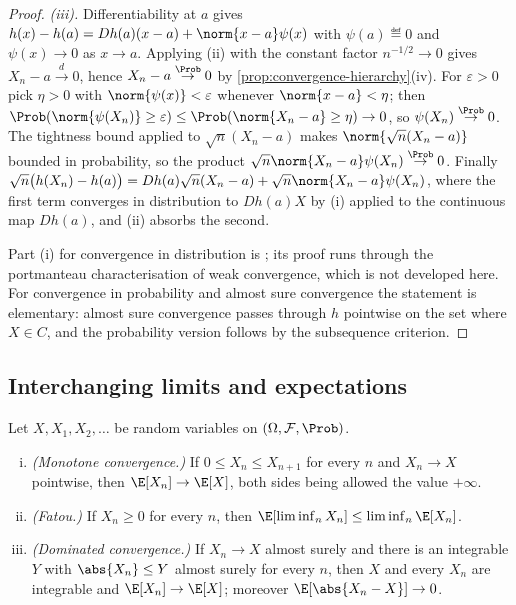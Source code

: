 \begin{proof}
	\emph{(iii).} Differentiability at $a$ gives
	$h(x)-h(a)=Dh(a)(x-a)+\norm{x-a}\psi(x)$ with $\psi(a)\eqdef0$ and
	$\psi(x)\to0$ as $x\to a$. Applying (ii) with the constant factor
	$n^{-1/2}\to0$ gives $X_n-a\overset{d}{\to}0$, hence
	$X_n-a\overset{\Prob}{\to}0$ by
	\autoref{prop:convergence-hierarchy}(iv). For $\varepsilon>0$ pick $\eta>0$
	with $\norm{\psi(x)}<\varepsilon$ whenever $\norm{x-a}<\eta$; then
	$\Prob(\norm{\psi(X_n)}\geq\varepsilon)\leq\Prob(\norm{X_n-a}\geq\eta)\to0$,
	so $\psi(X_n)\overset{\Prob}{\to}0$. The tightness bound applied to
	$\sqrt n(X_n-a)$ makes $\norm{\sqrt n(X_n-a)}$ bounded in probability, so
	the product $\sqrt n\norm{X_n-a}\psi(X_n)\overset{\Prob}{\to}0$. Finally
	$\sqrt n\bigl(h(X_n)-h(a)\bigr)
		=Dh(a)\sqrt n(X_n-a)+\sqrt n\norm{X_n-a}\psi(X_n)$, where the first term
	converges in distribution to $Dh(a)X$ by (i) applied to the continuous map
	$Dh(a)$, and (ii) absorbs the second.

	Part (i) for convergence in distribution is
	\textcite[Thm.~9.4.3, p.~562]{corbae2009introduction}; its proof runs
	through the portmanteau characterisation of weak convergence, which is not
	developed here. For convergence in probability and almost sure convergence
	the statement is elementary: almost sure convergence passes through $h$
	pointwise on the set where $X\in C$, and the probability version follows by
	the subsequence criterion.
\end{proof}

\subsection{Interchanging limits and expectations}\label{subsec:prob-convergence-thms}

\begin{theorem}\label{thm:convergence-theorems}
	Let $X,X_1,X_2,\dots$ be random variables on $(\Omega,\mathcal{F},\Prob)$.
	\begin{enumerate}[(i)]
		\item \emph{(Monotone convergence.)} If $0\leq X_n\leq X_{n+1}$ for every $n$
		      and $X_n\to X$ pointwise, then $\E[X_n]\to\E[X]$, both sides being
		      allowed the value $+\infty$.
		\item \emph{(Fatou.)} If $X_n\geq0$ for every $n$, then
		      $\E[\liminf_nX_n]\leq\liminf_n\E[X_n]$.
		\item \emph{(Dominated convergence.)} If $X_n\to X$ almost surely and there is
		      an integrable $Y$ with $\abs{X_n}\leq Y$ almost surely for every $n$,
		      then $X$ and every $X_n$ are integrable and $\E[X_n]\to\E[X]$; moreover
		      $\E[\abs{X_n-X}]\to0$.
	\end{enumerate}
\end{theorem}


